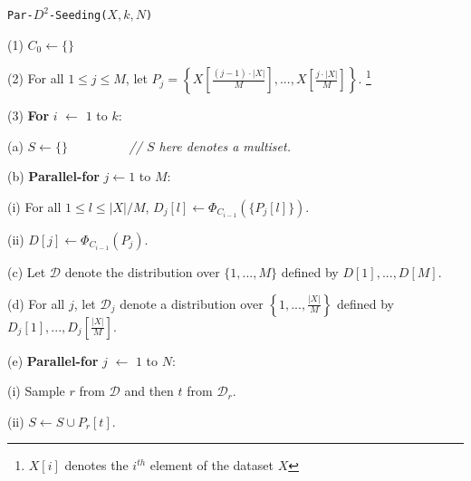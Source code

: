 \begin{center}
\begin{Algorithm}[h]
\begin{boxedminipage}{5.5in}
{\tt Par-$D^2$-Seeding($X, k, N$)}

\hspace{0.1in} (1) $C_0 \leftarrow \{\}$

\hspace{0.1in} (2) For all $1 \leq j \leq M$, let $P_j = \left\{X\left[{\frac{(j-1) \cdot |X|}{M}} \right], ..., X\left[{\frac{j \cdot |X|}{M}}\right]\right\}$. \footnote{$X[i]$ denotes the $i^{th}$ element of the dataset $X$}

\hspace{0.1in} (3) {\bf For} $i$ $\leftarrow$ $1$ to $k$:



\hspace{0.3in} (a) $S \leftarrow \{\}$ \ \ \ \ \ \ \ \ \ {\it // $S$ here denotes a multiset.}

\hspace{0.3in} (b) {\bf Parallel-for} $j \leftarrow 1$ to $M$:

\hspace{0.5in} (i) For all $1 \leq l \leq |X|/M$, $D_j[l] \leftarrow \Phi_{C_{i-1}}(\{P_j[l]\})$.

\hspace{0.5in} (ii) $D[j] \leftarrow \Phi_{C_{i-1}}(P_j)$.

\hspace{0.3in} (c) Let $\mathcal{D}$ denote the distribution over $\{1, ..., M\}$ defined by $D[1], ..., D[M]$.

\hspace{0.3in} (d) For all $j$, let $\mathcal{D}_j$ denote a distribution over $\left\{1, ..., \frac{|X|}{M} \right\}$ defined by $D_j[1], ..., D_j \left[\frac{|X|}{M}\right]$.


\hspace{0.3in} (e) {\bf Parallel-for} $j$ $\leftarrow$ $1$ to $N$:

\hspace{0.5in} (i) Sample $r$ from $\mathcal{D}$ and then $t$ from $\mathcal{D}_r$.

\hspace{0.5in} (ii) $S \leftarrow S \cup P_r[t]$.


\end{boxedminipage}
\end{Algorithm}
\end{center}
